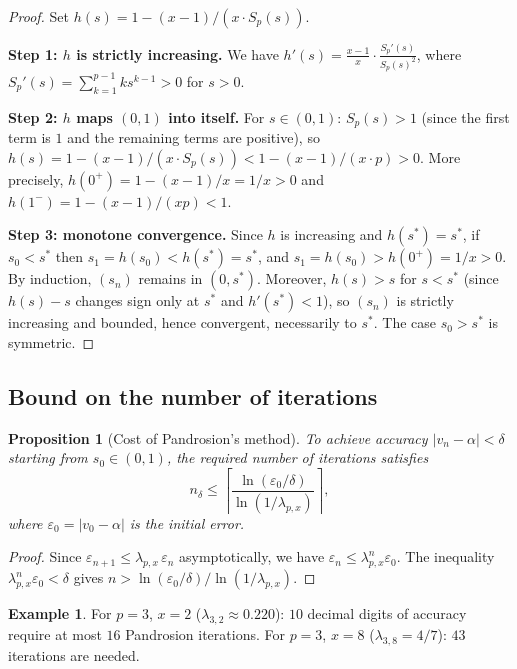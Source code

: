 \documentclass[10pt,a4paper,oneside]{book}
\newtheorem{proposition}[theorem]{Proposition}
\theoremstyle{definition}
\newtheorem{example}[theorem]{Example}
\theoremstyle{remark}
\newcommand{\eps}{\varepsilon}
\begin{document}
\begin{proof}
Set $h(s) = 1 - (x-1)/(x \cdot S_p(s))$.

\textbf{Step 1: $h$ is strictly increasing.}
We have $h'(s) = \frac{x-1}{x} \cdot \frac{S_p'(s)}{S_p(s)^2}$, where $S_p'(s) = \sum_{k=1}^{p-1} k s^{k-1} > 0$ for $s > 0$.

\textbf{Step 2: $h$ maps $(0,1)$ into itself.}
For $s \in (0,1)$: $S_p(s) > 1$ (since the first term is $1$ and the remaining terms are positive), so $h(s) = 1 - (x-1)/(x \cdot S_p(s)) < 1 - (x-1)/(x \cdot p) > 0$. More precisely, $h(0^+) = 1 - (x-1)/x = 1/x > 0$ and $h(1^-) = 1 - (x-1)/(xp) < 1$.

\textbf{Step 3: monotone convergence.}
Since $h$ is increasing and $h(s^*) = s^*$, if $s_0 < s^*$ then $s_1 = h(s_0) < h(s^*) = s^*$, and $s_1 = h(s_0) > h(0^+) = 1/x > 0$. By induction, $(s_n)$ remains in $(0, s^*)$. Moreover, $h(s) > s$ for $s < s^*$ (since $h(s) - s$ changes sign only at $s^*$ and $h'(s^*) < 1$), so $(s_n)$ is strictly increasing and bounded, hence convergent, necessarily to $s^*$. The case $s_0 > s^*$ is symmetric.
\end{proof}

\subsection{Bound on the number of iterations}

\begin{proposition}[Cost of Pandrosion's method]
\label{prop:cout}
To achieve accuracy $|v_n - \alpha| < \delta$ starting from $s_0 \in (0,1)$, the required number of iterations satisfies
\[
  n_\delta \leq \left\lceil \frac{\ln(\eps_0 / \delta)}{\ln(1/\lambda_{p,x})} \right\rceil,
\]
where $\eps_0 = |v_0 - \alpha|$ is the initial error.
\end{proposition}

\begin{proof}
Since $\eps_{n+1} \leq \lambda_{p,x}\,\eps_n$ asymptotically, we have $\eps_n \leq \lambda_{p,x}^n \eps_0$. The inequality $\lambda_{p,x}^n \eps_0 < \delta$ gives $n > \ln(\eps_0/\delta)/\ln(1/\lambda_{p,x})$.
\end{proof}

\begin{example}
For $p=3$, $x=2$ ($\lambda_{3,2} \approx 0.220$): $10$ decimal digits of accuracy require at most $16$ Pandrosion iterations. For $p=3$, $x=8$ ($\lambda_{3,8} = 4/7$): $43$ iterations are needed.
\end{example}
\end{document}
